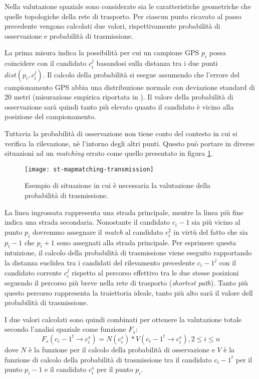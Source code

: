 Nella valutazione spaziale sono considerate sia le caratteristiche geometriche che quelle topologiche della rete di trasporto. Per ciascun punto ricavato al passo precedente vengono calcolati due valori, rispettivamente probabilità di osservazione e probabilità di trasmissione.

La prima misura indica la possibilità per cui un campione GPS $p_i$ possa coincidere con il candidato $c_i^j$ basandosi sulla distanza tra i due punti $dist(p_i, c_i^j)$. Il calcolo della probabilità si esegue assumendo che l'errore del campionamento GPS abbia una distribuzione normale con deviazione standard di 20 metri (misurazione empirica riportata in \cite[paragrafo 5.2]{stmapmatching}). Il valore della probabilità di osservazione sarà quindi tanto più elevato quanto il candidato è vicino alla posizione del campionamento. 

Tuttavia la probabilità di osservazione non tiene conto del contesto in cui si verifica la rilevazione, nè l'intorno degli altri punti. Questo può portare in diverse situazioni ad un \emph{matching} errato come quello presentato in figura \ref{fig:st-mapmatching-transmission}.

\begin{figure}[h]
  \centering
  \texttt{[image: st-mapmatching-transmission]}
  \caption{\footnotesize{Esempio di situazione in cui è necessaria la valutazione della probabilità di trasmissione.}}
  \label{fig:st-mapmatching-transmission}
\end{figure}
La linea ingrossata rappresenta una strada principale, mentre la linea più fine indica una strada secondaria. Nonostante il candidato $c_i-1$ sia più vicino al punto $p_i$ dovremmo assegnare il \emph{match} al candidato $c_i^2$ in virtù del fatto che sia $p_i-1$ che $p_i+1$ sono assegnati alla strada principale. Per esprimere questa intuizione, il calcolo della probabilità di trasmissione viene eseguito rapportando la distanza euclidea tra i candidati del rilevamento precedente $c_i-1^j$ con il candidato corrente $c_i^j$ rispetto al percorso effettivo tra le due stesse posizioni seguendo il percorso più breve nella rete di trasporto (\emph{shortest path}). Tanto più questo percorso rappresenta la traiettoria ideale, tanto più alto sarà il valore dell probabilità di trasmissione.

I due valori calcolati sono quindi combinati per ottenere la valutazione totale secondo l'analisi spaziale come funzione $F_s$:
$$ F_s(c_i-1^t \rightarrow c_i^s) = N(c_i^s) * V(c_i-1^t \rightarrow c_i^s), 2 \leq i \leq n $$
dove $N$ è la funzione per il calcolo della probabilità di osservazione e $V$ è la funzione di calcolo della probabilità di trasmissione tra il candidato $c_i-1^t$ per il punto $p_i-1$ e il candidato $c_i^s$ per il punto $p_i$.

